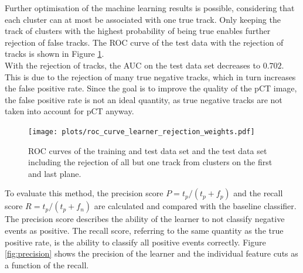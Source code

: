Further optimisation of the machine learning results is possible, considering that each cluster can at most be associated with one true track.
Only keeping the track of clusters with the highest probability of being true enables further rejection of
false tracks. The ROC curve of the test data with the rejection of tracks is shown in Figure \ref{fig:rejection}. \\
With the rejection of tracks, the AUC on the test data set decreases to $0.702$. This is due to the rejection of many true negative tracks, which in turn increases
the false positive rate. Since the goal is to improve the quality of the pCT image, the false positive rate is not an ideal quantity, as true negative tracks
are not taken into account for pCT anyway.

\begin{figure}[H]
  \centering
  \texttt{[image: plots/roc\_curve\_learner\_rejection\_weights.pdf]}
  \caption{ROC curves of the training and test data set and the test data set including the rejection of all but one track from clusters on the first and last plane.}
  \label{fig:rejection}
\end{figure}

To evaluate this method, the precision score $P=t_p/(t_p + f_p)$ and the recall score $R=t_p/(t_p + f_n)$ are calculated and compared with the baseline classifier. The precision
score describes the ability of the learner to not classify negative events as positive. The recall score, referring to the same quantity as the true positive rate,
is the ability to classify all positive events correctly.
Figure \ref{fig:precision} shows the precision of the learner and the individual feature cuts as a function of the recall.

